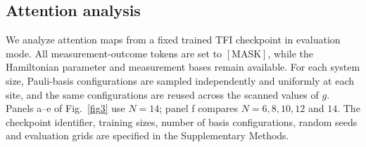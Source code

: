 \documentclass[pdflatex,sn-nature]{sn-jnl}%
\theoremstyle{thmstyleone}%
\theoremstyle{thmstyletwo}%
\theoremstyle{thmstylethree}%
\begin{document}



\subsection{Attention analysis}
\label{sec:method_attention}

We analyze attention maps from a fixed trained TFI checkpoint in evaluation mode. All measurement-outcome tokens are set to \([\mathrm{MASK}]\), while the Hamiltonian parameter and measurement bases remain available. For each system size, Pauli-basis configurations are sampled independently and uniformly at each site, and the same configurations are reused across the scanned values of \(g\). Panels a--e of Fig.~\ref{fig3} use \(N=14\); panel f compares \(N=6,8,10,12\) and \(14\). The checkpoint identifier, training sizes, number of basis configurations, random seeds and evaluation grids are specified in the Supplementary Methods.
\end{document}
